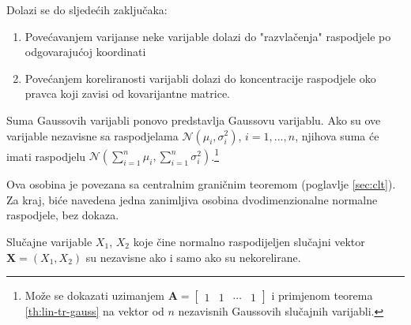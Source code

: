 \noindent
Dolazi se do sljedećih zaključaka:
\begin{enumerate}
	\item Povećavanjem varijanse neke varijable dolazi do "razvlačenja" raspodjele
		po odgovarajućoj koordinati
	\item Povećanjem koreliranosti varijabli dolazi do koncentracije raspodjele
		oko pravca koji zavisi od kovarijantne matrice.
\end{enumerate}

\begin{corollary}
  Suma Gaussovih varijabli ponovo predstavlja Gaussovu varijablu. Ako su ove
  varijable nezavisne sa raspodjelama $\mathcal{N}(\mu_i, \sigma_i^2)$,
  $i=1,...,n$, njihova suma će imati raspodjelu
  $\mathcal{N}(\sum_{i=1}^{n}\mu_i, \sum_{i=1}^{n}\sigma_i^2)$.\footnote{
    Može se dokazati uzimanjem $\bm A = \left[
        \begin{array}{cccc}
          1 & 1 & \cdots & 1
        \end{array}\right]$
    i primjenom teorema \ref{th:lin-tr-gauss} na vektor od $n$ nezavisnih
    Gaussovih slučajnih varijabli.
  }
\end{corollary}

Ova osobina je povezana sa centralnim graničnim teoremom (poglavlje
\ref{sec:clt}). Za kraj, biće navedena jedna zanimljiva osobina
dvodimenzionalne normalne raspodjele, bez dokaza.

\begin{theorem}

  Slučajne varijable $X_1$, $X_2$ koje čine normalno raspodijeljen slučajni
  vektor $\bm X = (X_1, X_2)$ su nezavisne ako i samo ako su nekorelirane.

\end{theorem}

